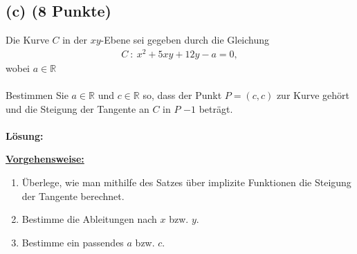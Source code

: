 \subsection*{(c) (8 Punkte)}
Die Kurve $C$ in der $xy$-Ebene sei gegeben durch die Gleichung
\begin{align*}
C  \ : \ x^2+5xy+12y-a= 0,
\end{align*}
wobei $a \in \mathbb{R}$ \\
\\
Bestimmen Sie $a \in \mathbb{R}$ und $c \in \mathbb{R}$ so, dass
der Punkt $P = (c,c)$ zur Kurve gehört und die Steigung der Tangente an $C$ in $P$ $-1$ beträgt.
\\
\\
\textbf{Lösung:}
\begin{mdframed}
\underline{\textbf{Vorgehensweise:}}
\begin{enumerate}
\item Überlege, wie man mithilfe des Satzes über implizite Funktionen die Steigung der Tangente berechnet.
\item Bestimme die Ableitungen nach $x$ bzw. $y$.
\item Bestimme ein passendes $a$ bzw. $c$.
\end{enumerate}
\end{mdframed}

